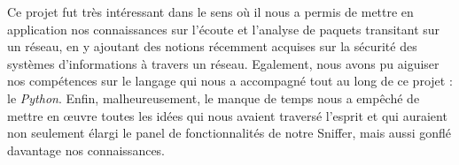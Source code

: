 Ce projet fut très intéressant dans le sens où il nous a permis de mettre en application nos connaissances sur l'écoute et l'analyse de paquets transitant sur un réseau, en y ajoutant des notions récemment acquises sur la sécurité des systèmes d'informations à travers un réseau. Egalement, nous avons pu aiguiser nos compétences sur le langage qui nous a accompagné tout au long de ce projet : le \emph{Python}. Enfin, malheureusement, le manque de temps nous a empêché de mettre en \oe uvre toutes les idées qui nous avaient traversé l'esprit et qui auraient non seulement élargi le panel de fonctionnalités de notre Sniffer, mais aussi gonflé davantage nos connaissances.
